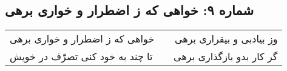 \begin{center}
\section*{شماره ۹: خواهی که ز اضطرار و خواری برهی}
\label{sec:009}
\begin{longtable}{l p{0.5cm} r}
خواهی که ز اضطرار و خواری برهی
&&
وز بیادبی و بیقراری برهی
\\
تا چند به خود کنی تصرّف در خویش
&&
گر کار بدو بازگذاری برهی
\\
\end{longtable}
\end{center}
